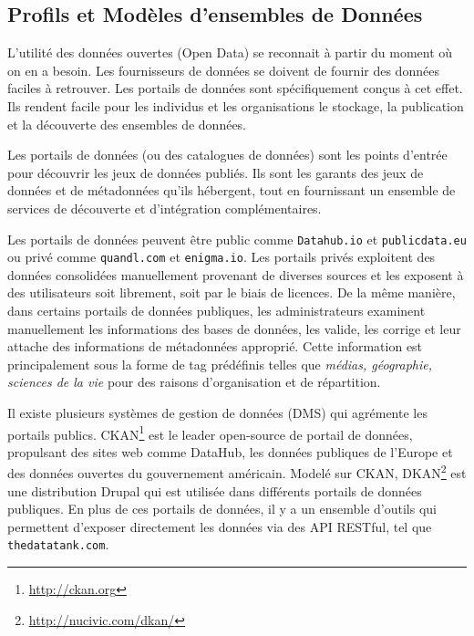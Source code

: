 
\subsection{Profils et Mod\`{e}les d'ensembles de Donn\'{e}es}

L'utilit\'{e} des donn\'{e}es ouvertes (Open Data) se reconnait à partir du moment où on en a besoin. Les fournisseurs de donn\'{e}es se doivent de fournir des donn\'{e}es faciles à retrouver. Les portails de donn\'{e}es sont sp\'{e}cifiquement conçus à cet effet. Ils rendent facile pour les individus et les organisations le stockage, la publication et la d\'{e}couverte des ensembles de donn\'{e}es.

Les portails de donn\'{e}es (ou des catalogues de donn\'{e}es) sont les points d'entr\'{e}e pour d\'{e}couvrir les jeux de donn\'{e}es publi\'{e}s. Ils sont les garants des jeux de donn\'{e}es et de m\'{e}tadonn\'{e}es qu'ils h\'{e}bergent, tout en fournissant un ensemble de services de d\'{e}couverte et d'int\'{e}gration compl\'{e}mentaires.

Les portails de donn\'{e}es peuvent être public comme \texttt{Datahub.io} et \texttt{publicdata.eu} ou priv\'{e} comme \texttt{quandl.com} et \texttt{enigma.io}. Les portails priv\'{e}s exploitent des donn\'{e}es consolid\'{e}es manuellement provenant de diverses sources et les exposent à des utilisateurs soit librement, soit par le biais de licences. De la même mani\`{e}re, dans certains portails de donn\'{e}es publiques, les administrateurs examinent manuellement les informations des bases de donn\'{e}es, les valide, les corrige et leur attache des informations de m\'{e}tadonn\'{e}es appropri\'{e}. Cette information est principalement sous la forme de tag pr\'{e}d\'{e}finis telles que \textit{m\'{e}dias, g\'{e}ographie, sciences de la vie} pour des raisons d'organisation et de r\'{e}partition.

Il existe plusieurs syst\`{e}mes de gestion de donn\'{e}es (DMS) qui agr\'{e}mente les portails publics. CKAN\footnote{\url{http://ckan.org}} est le leader open-source de portail de donn\'{e}es, propulsant des sites web comme DataHub, les donn\'{e}es publiques de l'Europe et des donn\'{e}es ouvertes du gouvernement am\'{e}ricain. Model\'{e} sur CKAN, DKAN\footnote{\url{http://nucivic.com/dkan/}} est une distribution Drupal qui est utilis\'{e}e dans diff\'{e}rents portails de donn\'{e}es publiques. En plus de ces portails de donn\'{e}es, il y a un ensemble d'outils qui permettent d'exposer directement les donn\'{e}es via des API RESTful, tel que \texttt{thedatatank.com}.

